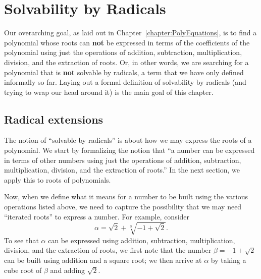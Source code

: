 \chapter{Solvability by Radicals}
\label{chapter:SolvabilityByRadicals}
\thispagestyle{empty}

Our overarching goal, as laid out in Chapter~\ref{chapter:PolyEquations}, is to find a polynomial whose roots can  \textbf{not} be expressed in terms of the coefficients of the polynomial using just the operations of addition, subtraction, multiplication, division, and the extraction of roots. Or, in other words, we are searching for a polynomial that is  \textbf{not} solvable by radicals, a term that we have only defined informally so far. Laying out a formal definition  of solvability by radicals (and trying to wrap our head around it) is the main goal of this chapter.


\section{Radical extensions}

The notion of ``solvable by radicals'' is about how we may express the roots of a polynomial. We start by formalizing the notion that ``a number can be expressed in terms of other numbers using just the operations of addition, subtraction, multiplication, division, and the extraction of roots.'' In the next section, we apply this to roots of polynomials.

 
Now, when we define what it means for a number to be built using the various operations listed above, we need to capture the possibility that we may need ``iterated roots'' to express a number. For example, consider \[\alpha = \sqrt{2} + \sqrt[3]{-1 + \sqrt{2}}.\]
To see that $\alpha$ can be expressed using addition, subtraction, multiplication, division, and the extraction of roots, we first note that the number $\beta = -1 + \sqrt{2}$ can be built using addition and a square root; we then arrive at $\alpha$ by taking a cube root of $\beta$ and adding $\sqrt{2}$.

